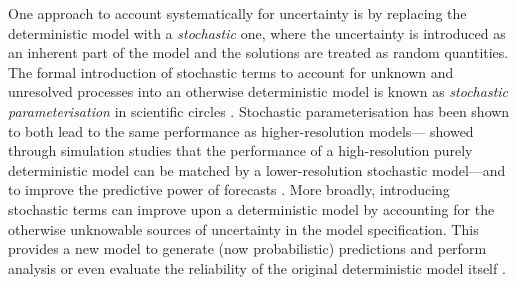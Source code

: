 One approach to account systematically for uncertainty is by replacing the deterministic model with a \emph{stochastic} one, where the uncertainty is introduced as an inherent part of the model and the solutions are treated as random quantities.
The formal introduction of stochastic terms to account for unknown and unresolved processes into an otherwise deterministic model is known as \emph{stochastic parameterisation} in scientific circles \citep{BernerEtAl_2017_StochasticParameterizationNew,Palmer_2019_StochasticWeatherClimate}.
Stochastic parameterisation has been shown to both lead to the same performance as higher-resolution models---\citet{DawsonPalmer_2015_SimulatingWeatherRegimes} showed through simulation studies that the performance of a high-resolution purely deterministic model can be matched by a lower-resolution stochastic model---and to improve the predictive power of forecasts \citep{MitchellGottwald_2012_DataAssimilationSlow,HaEtAl_2015_ComparisonModelError}.
More broadly, introducing stochastic terms can improve upon a deterministic model by accounting for the otherwise unknowable sources of uncertainty in the model specification.
This provides a new model to generate (now probabilistic) predictions and perform analysis or even evaluate the reliability of the original deterministic model itself \citep{Balasuriya_2020_StochasticSensitivityComputable}.

